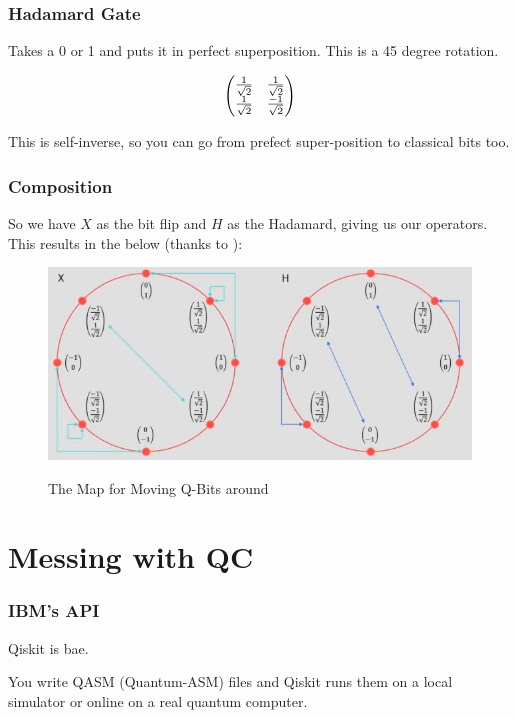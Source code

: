 \documentclass{beamer}
\begin{document}
\begin{frame}
\frametitle{Hadamard Gate}
Takes a 0 or 1 and puts it in perfect
superposition. This is a 45 degree
rotation.

\[
    \begin{pmatrix}
    {1 \over \sqrt{2}} & {1 \over \sqrt{2}}\\
    {1 \over \sqrt{2}} & {-1 \over \sqrt{2}}
    \end{pmatrix}
\]

This is self-inverse, so you can go from
prefect super-position to classical bits too.
\end{frame}

\begin{frame}
\frametitle{Composition}
So we have $X$ as the bit flip and
$H$ as the Hadamard, giving us our operators. This results in the below (thanks to \cite{img-blog}):
\begin{figure}
    \centering
    \includegraphics[width=.75\linewidth]{qt-unit-circle.jpg}
    \label{fig:qt-unit-circle}
    \caption{The Map for Moving Q-Bits around}
\end{figure}
\end{frame}

\section{Messing with QC}

\begin{frame}
\frametitle{IBM's API}
Qiskit is bae.

You write QASM (Quantum-ASM) files and Qiskit runs them on a local simulator or online on a real quantum computer.
\end{frame}
\end{document}
